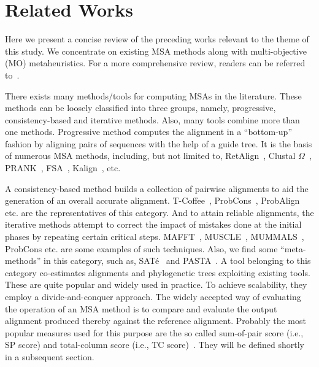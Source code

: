 \section{Related Works}
\label{sec:literature}
Here we present a concise review of the preceding works relevant to the theme of this study. We concentrate on existing MSA methods along with multi-objective (MO) metaheuristics. For a more comprehensive review, readers can be referred to~\citep{warnow2017computational}.

There exists many methods/tools for computing MSAs in the literature. These methods can be loosely classified into three groups, namely, progressive, consistency-based and iterative methods. Also, many tools combine more than one methods. Progressive method computes the alignment in a ``bottom-up'' fashion by aligning pairs of sequences with the help of a guide tree. It is the basis of numerous MSA methods, including, but not limited to, RetAlign~\citep{szabo2010reticular}, Clustal $\Omega$~\citep{sievers2011fast}, PRANK~\citep{loytynoja2005algorithm}, FSA~\citep{bradley2009fast},  Kalign~\citep{lassmann2008kalign2}, etc. 



A consistency-based method builds a collection of pairwise alignments to aid the generation of an overall accurate alignment. T-Coffee~\citep{notredame2000t}, ProbCons~\citep{do2005probcons}, ProbAlign~\citep{roshan2006probalign} etc. are the representatives of this category. And to attain reliable alignments, the iterative methods attempt to correct the impact of mistakes done at the initial phases by repeating certain critical steps. MAFFT~\citep{katoh2002mafft}, MUSCLE~\citep{edgar2004muscle}, MUMMALS~\citep{pei2006mummals}, ProbCons etc. are some examples of such techniques. Also, we find some ``meta-methods'' in this category, such as, SAT\'e~\citep{liu2009rapid} and PASTA~\citep{mirarab2015pasta}. A tool belonging to this category  co-estimates alignments and phylogenetic trees exploiting existing tools. These are quite popular and widely used in practice. To achieve scalability, they employ a divide-and-conquer approach. The widely accepted way of evaluating the operation of an MSA method is to compare and evaluate the output alignment produced thereby against the reference alignment. Probably the most popular measures used for this purpose are the so called sum-of-pair score (i.e., SP score) and total-column score (i.e., TC score)~\citep{warnow2017computational}. They will be defined shortly in a subsequent section.


